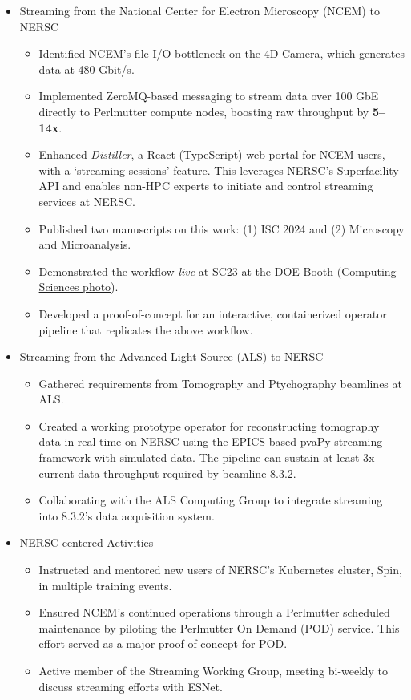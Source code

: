 \documentclass[11pt]{article} %
\begin{document}
\begin{itemize}
  \item Streaming from the National Center for Electron Microscopy (NCEM) to NERSC
    \begin{itemize}
      \item Identified NCEM's file I/O bottleneck on the 4D Camera, which generates data at 480 Gbit/s.
      \item Implemented ZeroMQ-based messaging to stream data over 100 GbE directly to Perlmutter compute nodes, boosting raw throughput by \textbf{5--14x}.
      \item Enhanced \textit{Distiller}, a React (TypeScript) web portal for NCEM users, with a `streaming sessions' feature. This leverages NERSC's Superfacility API and enables non-HPC experts to initiate and control streaming services at NERSC.\
      \item Published two manuscripts on this work: (1) ISC 2024 and (2) Microscopy and Microanalysis.
      \item Demonstrated the workflow \textit{live} at SC23 at the DOE Booth (\href{https://www.facebook.com/photo/?fbid=845960860865319&set=pcb.845964620864943}{Computing Sciences photo}).
      \item Developed a proof-of-concept for an interactive, containerized operator pipeline that replicates the above workflow.
    \end{itemize}

  \item Streaming from the Advanced Light Source (ALS) to NERSC
    \begin{itemize}
      \item Gathered requirements from Tomography and Ptychography beamlines at ALS.
      \item Created a working prototype operator for reconstructing tomography data in real time on NERSC using the EPICS-based pvaPy \href{https://github.com/epics-base/pvaPy/blob/master/documentation/streamingFramework.md#processing-chains}{streaming framework} with simulated data. The pipeline can sustain at least 3x current data throughput required by beamline 8.3.2.
      \item Collaborating with the ALS Computing Group to integrate streaming into 8.3.2's data acquisition system.
    \end{itemize}

  \item NERSC-centered Activities
    \begin{itemize}
      \item Instructed and mentored new users of NERSC's Kubernetes cluster, Spin, in multiple training events.
      \item Ensured NCEM's continued operations through a Perlmutter scheduled maintenance by piloting the Perlmutter On Demand (POD) service. This effort served as a major proof-of-concept for POD.\
      \item Active member of the Streaming Working Group, meeting bi-weekly to discuss streaming efforts with ESNet.
    \end{itemize}


\end{itemize}
\end{document}
